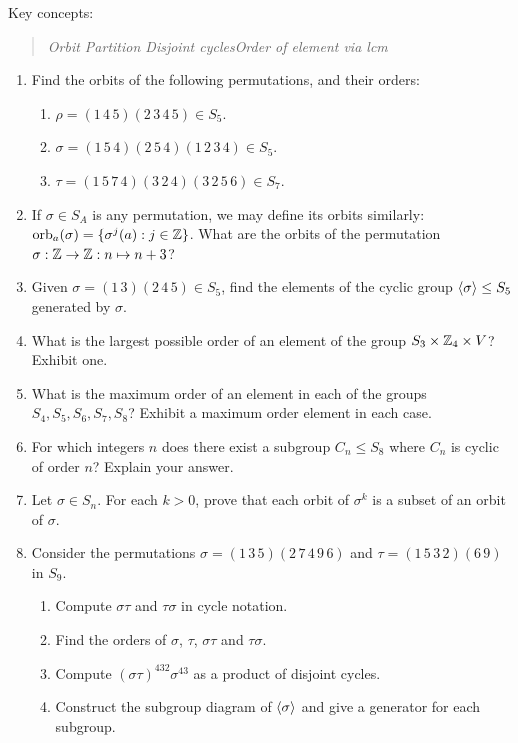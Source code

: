 \goodbreak

\begin{exercises}
	Key concepts:
	\begin{quote}
		\emph{Orbit \qquad Partition \qquad Disjoint cycles\qquad Order of element via lcm}
	\end{quote}
	
	\begin{enumerate}
	  \item Find the orbits of the following permutations, and their orders:
	  \begin{enumerate}
	    \item $\rho=(1\,4\,5)(2\,3\,4\,5)\in S_5$.
	    \item $\sigma=(1\,5\,4)(2\,5\,4)(1\,2\,3\,4)\in S_5$.
	    \item $\tau=(1\,5\,7\,4)(3\,2\,4)(3\,2\,5\,6)\in S_7$.
	  \end{enumerate}
	
	
	  \item If $\sigma\in S_A$ is any permutation, we may define its orbits similarly: $\mathrm{orb}_a(\sigma)=\{\sigma^j(a):j\in\mathbb{Z}\}$. What are the orbits of the permutation $\sigma:\mathbb{Z}\to\mathbb{Z}:n\mapsto n+3$?
	  
		
		\item Given $\sigma=(1\,3)(2\,4\,5)\in S_5$, find the elements of the cyclic group $\left\langle \sigma\right\rangle\le S_5$ generated by $\sigma$.
		
		
		\item What is the largest possible order of an element of the group $S_3\times\mathbb{Z}_4\times V$? Exhibit one.
	
	
		\item What is the maximum order of an element in each of the groups $S_4,S_5,S_6,S_7,S_8$? Exhibit a maximum order element in each case.
		
	
		\item For which integers $n$ does there exist a subgroup $C_n\le S_8$ where $C_n$ is cyclic of order $n$? Explain your answer.
		
	
	 	\item Let $\sigma\in S_n$. For each $k>0$, prove that each orbit of $\sigma^k$ is a subset of an orbit of $\sigma$.
	 	
	
		\item Consider the permutations $\sigma=(1\,3\,5)(2\,7\,4\,9\,6)$ and $\tau=(1\,5\,3\,2)(6\,9)$ in $S_9$.
	  \begin{enumerate}
	      \item Compute $\sigma\tau$ and $\tau\sigma$ in cycle notation.
	      \item Find the orders of $\sigma$, $\tau$, $\sigma\tau$ and $\tau\sigma$.
	      \item Compute $(\sigma\tau)^{432}\sigma^{43}$ as a product of disjoint cycles.
				\item Construct the subgroup diagram of $\left\langle \sigma\right\rangle$ and give a generator for each subgroup.
	  \end{enumerate}
	  
	\end{enumerate}
\end{exercises}


